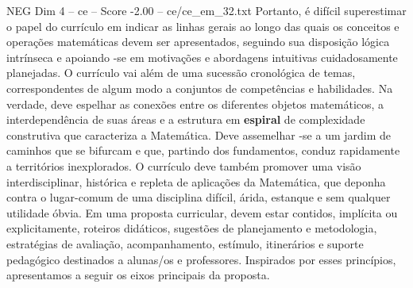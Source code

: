 \begin{textsample}{NEG Dim 4 – ce – Score -2.00 – ce/ce\_em\_32.txt}
Portanto, é difícil superestimar o papel do currículo em indicar as linhas gerais ao longo das quais os conceitos e operações matemáticas devem ser apresentados, seguindo sua disposição lógica intrínseca e apoiando -se em motivações e abordagens intuitivas cuidadosamente planejadas.
O currículo vai além de uma sucessão cronológica de temas, correspondentes de algum modo a conjuntos de competências e habilidades.
Na verdade, deve espelhar as conexões entre os diferentes objetos matemáticos, a interdependência de suas áreas e a estrutura em \textbf{espiral} de complexidade construtiva que caracteriza a Matemática.
Deve assemelhar -se a um jardim de caminhos que se bifurcam e que, partindo dos fundamentos, conduz rapidamente a territórios inexplorados.
O currículo deve também promover uma visão interdisciplinar, histórica e repleta de aplicações da Matemática, que deponha contra o lugar-comum de uma disciplina difícil, árida, estanque e sem qualquer utilidade óbvia.
Em uma proposta curricular, devem estar contidos, implícita ou explicitamente, roteiros didáticos, sugestões de planejamento e metodologia, estratégias de avaliação, acompanhamento, estímulo, itinerários e suporte pedagógico destinados a alunas/os e professores.
Inspirados por esses princípios, apresentamos a seguir os eixos principais da proposta.

\end{textsample}
